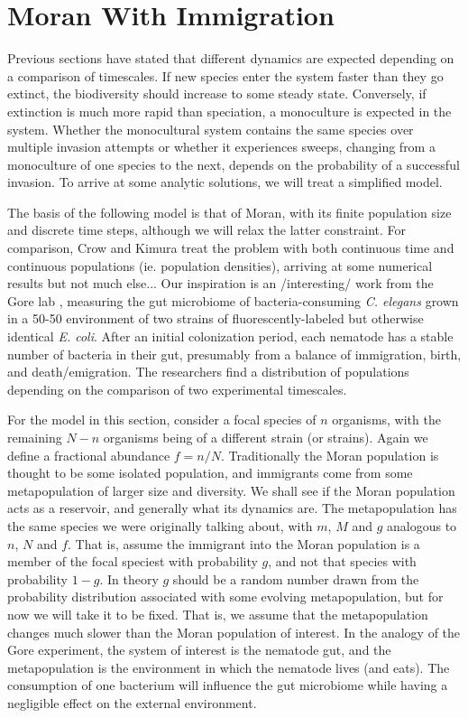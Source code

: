 \section{Moran With Immigration}
Previous sections have stated that different dynamics are expected depending on a comparison of timescales. 
If new species enter the system faster than they go extinct, the biodiversity should increase to some steady state. 
Conversely, if extinction is much more rapid than speciation, a monoculture is expected in the system. 
Whether the monocultural system contains the same species over multiple invasion attempts or whether it experiences sweeps, changing from a monoculture of one species to the next, depends on the probability of a successful invasion. 
To arrive at some analytic solutions, we will treat a simplified model. 

The basis of the following model is that of Moran, with its finite population size and discrete time steps, although we will relax the latter constraint. 
For comparison, Crow and Kimura \cite{Crow1956,Kimura1983} treat the problem with both continuous time and continuous populations (ie. population densities), arriving at some numerical results but not much else...
Our inspiration is an /interesting/ work from the Gore lab \cite{Vega2017}, measuring the gut microbiome of bacteria-consuming \emph{C. elegans} grown in a 50-50 environment of two strains of fluorescently-labeled but otherwise identical \emph{E. coli}. 
After an initial colonization period, each nematode has a stable number of bacteria in their gut, presumably from a balance of immigration, birth, and death/emigration. 
The researchers find a distribution of populations depending on the comparison of two experimental timescales. 

For the model in this section, consider a focal species of $n$ organisms, with the remaining $N-n$ organisms being of a different strain (or strains). 
Again we define a fractional abundance $f=n/N$. 
Traditionally the Moran population is thought to be some isolated population, and immigrants come from some metapopulation of larger size and diversity. 
We shall see if the Moran population acts as a reservoir, and generally what its dynamics are. 
The metapopulation has the same species we were originally talking about, with $m$, $M$ and $g$ analogous to $n$, $N$ and $f$. 
That is, assume the immigrant into the Moran population is a member of the focal speciest with probability $g$, and not that species with probability $1-g$. 
In theory $g$ should be a random number drawn from the probability distribution associated with some evolving metapopulation, but for now we will take it to be fixed. That is, we assume that the metapopulation changes much slower than the Moran population of interest. 
In the analogy of the Gore experiment, the system of interest is the nematode gut, and the metapopulation is the environment in which the nematode lives (and eats). 
The consumption of one bacterium will influence the gut microbiome while having a negligible effect on the external environment. 

